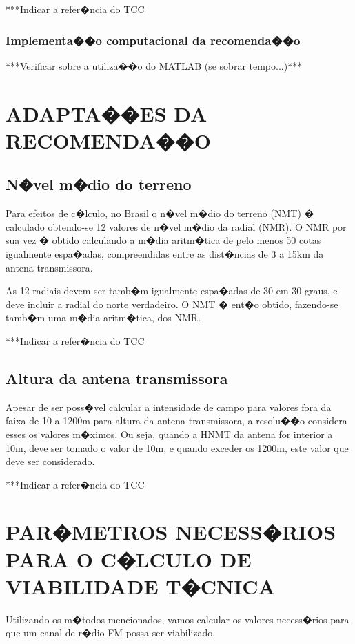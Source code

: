 ***Indicar a refer�ncia do TCC 
 


\subsubsection{Implementa��o computacional da recomenda��o}

***Verificar sobre a utiliza��o do MATLAB (se sobrar tempo...)*** 

\section{ADAPTA��ES DA RECOMENDA��O}

\subsection{N�vel m�dio do terreno}

Para efeitos de c�lculo, no Brasil o n�vel m�dio do terreno (NMT) � calculado
obtendo-se 12 valores de n�vel m�dio da radial (NMR). O NMR por sua vez � obtido
calculando a m�dia aritm�tica de pelo menos 50 cotas igualmente espa�adas,
compreendidas entre as dist�ncias de 3 a 15km da antena transmissora.

As 12 radiais devem ser tamb�m igualmente espa�adas de 30 em 30 graus, e deve
incluir a radial do norte verdadeiro. O NMT � ent�o obtido, fazendo-se tamb�m uma m�dia
aritm�tica, dos NMR.

***Indicar a refer�ncia do TCC 

\subsection{Altura da antena transmissora}

Apesar de ser poss�vel calcular a intensidade de campo para valores fora da faixa de
10 a 1200m para altura da antena transmissora, a resolu��o considera esses os valores
m�ximos. Ou seja, quando a HNMT da antena for interior a 10m, deve ser tomado o valor de
10m, e quando exceder os 1200m, este valor que deve ser considerado.

***Indicar a refer�ncia do TCC 

\section{PAR�METROS NECESS�RIOS PARA O C�LCULO DE VIABILIDADE T�CNICA}

Utilizando os m�todos mencionados, vamos calcular os valores necess�rios para que um canal de r�dio FM possa ser viabilizado.

